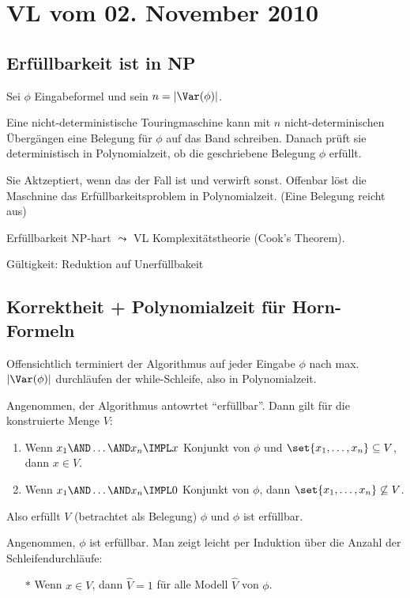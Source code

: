 \section{VL vom 02. November 2010}

\subsection{Erfüllbarkeit ist in NP}

Sei $\phi$ Eingabeformel und sein $n = |\Var(\phi)|$.

Eine nicht-deterministische Touringmaschine kann mit $n$ nicht-determinischen
Übergängen eine Belegung für $\phi$ auf das Band schreiben. Danach prüft sie
deterministisch in Polynomialzeit, ob die geschriebene Belegung $\phi$ erfüllt.

Sie Aktzeptiert, wenn das der Fall ist und verwirft sonst. Offenbar löst die
Maschnine das Erfüllbarkeitsproblem in Polynomialzeit.
(Eine Belegung reicht aus)

Erfüllbarkeit NP-hart $\leadsto$ VL Komplexitätstheorie (Cook's Theorem).

Gültigkeit: Reduktion auf Unerfüllbakeit 

\subsection{Korrektheit + Polynomialzeit für Horn-Formeln}

Offensichtlich terminiert der Algorithmus auf jeder Eingabe $\phi$ nach max.
$|\Var(\phi)|$ durchläufen der while-Schleife, also in Polynomialzeit.

Angenommen, der Algorithmus antowrtet \enquote{erfüllbar}. Dann gilt für die
konstruierte Menge $V$:

\begin{enumerate}
  \item Wenn $x_1\AND\dots\AND x_n \IMPL x$ Konjunkt von $\phi$ und $\set{x_1,\dots,x_n} \subseteq V$, dann $x \in V$.
  \item Wenn $x_1\AND\dots\AND x_n \IMPL 0$ Konjunkt von $\phi$, dann $\set{x_1,\dots,x_n} \not\subseteq V$.
\end{enumerate}

Also erfüllt $V$ (betrachtet als Belegung) $\phi$ und $\phi$ ist erfüllbar.

Angenommen, $\phi$ ist erfüllbar. Man zeigt leicht per Induktion über die Anzahl der Schleifendurchläufe:

\begin{itemize}
  \item[$*$] Wenn $x \in V$, dann $\hat{V}=1$ für alle Modell $\hat{V}$ von $\phi$.
\end{itemize}


